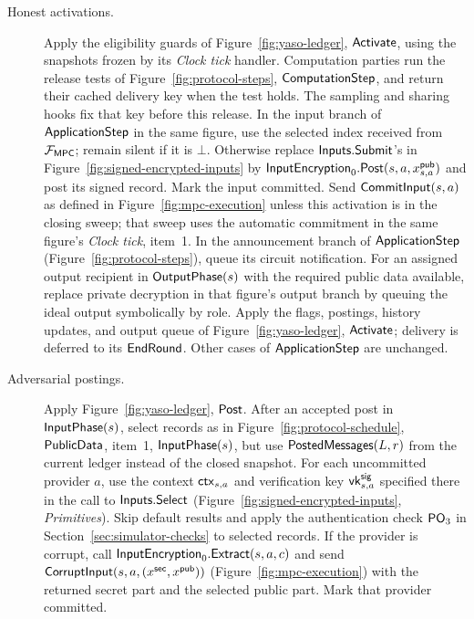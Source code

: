 \begin{description}
\item[Honest activations.]
 Apply the eligibility guards of Figure~\ref{fig:yaso-ledger},
 $\mathsf{Activate}$, using the snapshots frozen by its \emph{Clock tick} handler.
 Computation parties run the release tests of
 Figure~\ref{fig:protocol-steps}, $\mathsf{ComputationStep}$, and return their
 cached delivery key when the test holds.  The sampling and sharing
 hooks fix that key before this release.
 In the input branch of $\mathsf{ApplicationStep}$ in the same figure, use
 the selected index received from $\mathcal F_{\mathsf{MPC}}$; remain silent if it is $\bot$.
 Otherwise replace $\mathsf{Inputs}.\mathsf{Submit}$'s \emph{\WhatField} in
 Figure~\ref{fig:signed-encrypted-inputs} by
 $\mathsf{InputEncryption}_0.\mathsf{Post}(s,a,x^{\mathsf{pub}}_{s,a})$ and post its signed record.
 Mark the input committed.  Send $\mathsf{CommitInput}(s,a)$ as defined in
 Figure~\ref{fig:mpc-execution} unless this activation is in the closing
 sweep; that sweep uses the automatic commitment in the same figure's
 \emph{Clock tick}, item~1.
 In the announcement branch of $\mathsf{ApplicationStep}$
 (Figure~\ref{fig:protocol-steps}), queue its circuit notification.
 For an assigned output recipient in $\mathsf{OutputPhase}(s)$ with the required
 public data available, replace private decryption in that figure's
 output branch by queuing the ideal output symbolically by role.  Apply the flags, postings, history updates, and output queue
 of Figure~\ref{fig:yaso-ledger}, $\mathsf{Activate}$; delivery is deferred to
 its $\mathsf{EndRound}$.  Other cases of $\mathsf{ApplicationStep}$ are unchanged.

\item[Adversarial postings.]
 Apply Figure~\ref{fig:yaso-ledger}, $\mathsf{Post}$.
 After an accepted post in $\mathsf{InputPhase}(s)$, select records as in
 Figure~\ref{fig:protocol-schedule}, $\mathsf{PublicData}$, item~1,
 $\mathsf{InputPhase}(s)$, but use $\mathsf{PostedMessages}(L,r)$ from the current
 ledger instead of the closed snapshot.  For each uncommitted provider
 $a$, use the context $\mathsf{ctx}_{s,a}$ and verification key $\mathsf{vk}^{\mathsf{sig}}_{s,a}$
 specified there in the call to $\mathsf{Inputs}.\mathsf{Select}$
 (Figure~\ref{fig:signed-encrypted-inputs}, \emph{Primitives}).
 Skip default results and apply the authentication check
 $\mathsf{PO}_{3}$ in Section~\ref{sec:simulator-checks} to selected records.
 If the provider is corrupt, call
 $\mathsf{InputEncryption}_0.\mathsf{Extract}(s,a,c)$ and send
 $\mathsf{CorruptInput}(s,a,(x^{\mathsf{sec}},x^{\mathsf{pub}}))$
 (Figure~\ref{fig:mpc-execution}) with the returned secret part and
 the selected public part.  Mark that provider committed.


\end{description}
